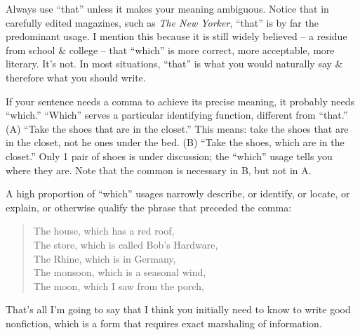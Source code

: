 \documentclass{article}
\begin{document}
Always use ``that'' unless it makes your meaning ambiguous. Notice that in carefully edited magazines, such as \textit{The New Yorker}, ``that'' is by far the predominant usage. I mention this because it is still widely believed -- a residue from school \& college -- that ``which'' is more correct, more acceptable, more literary. It's not. In most situations, ``that'' is what you would naturally say \& therefore what you should write.

If your sentence needs a comma to achieve its precise meaning, it probably needs ``which.'' ``Which'' serves a particular identifying function, different from ``that.'' (A) ``Take the shoes that are in the closet.'' This means: take the shoes that are in the closet, not he ones under the bed. (B) ``Take the shoes, which are in the closet.'' Only 1 pair of shoes is under discussion; the ``which'' usage tells you where they are. Note that the common is necessary in B, but not in A.

A high proportion of ``which'' usages narrowly describe, or identify, or locate, or explain, or otherwise qualify the phrase that preceded the comma:
\begin{quote}
	The house, which has a red roof,\\The store, which is called Bob's Hardware,\\The Rhine, which is in Germany,\\The monsoon, which is a seasonal wind,\\The moon, which I saw from the porch,
\end{quote}
That's all I'm going to say that I think you initially need to know to write good nonfiction, which is a form that requires exact marshaling of information.
\end{document}

